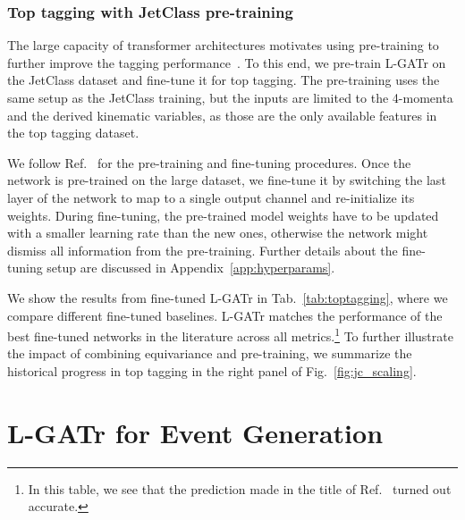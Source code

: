 \documentclass[submission, Phys]{SciPost}
\begin{document}
\subsubsection*{Top tagging with JetClass pre-training}

The large capacity of transformer architectures motivates using pre-training to further improve the tagging performance~\cite{Qu:2022mxj}.
To this end, we pre-train L-GATr on the JetClass dataset and fine-tune it for top tagging.
The pre-training uses the same setup as the JetClass training, but the inputs are limited to the 4-momenta and the derived kinematic variables, as those are the only available features in the top tagging dataset.

We follow Ref.~\cite{Qu:2022mxj} for the pre-training and fine-tuning procedures. Once the network is pre-trained on the large dataset, we fine-tune it by switching the last layer of the network to map to a single output channel and re-initialize its weights. During fine-tuning, the pre-trained model weights have to be updated with a smaller learning rate than the new ones, otherwise the network might dismiss all information from the pre-training. Further details about the fine-tuning setup are discussed in Appendix~\ref{app:hyperparams}.

We show the results from fine-tuned L-GATr in Tab.~\ref{tab:toptagging}, where we compare different fine-tuned baselines. L-GATr matches the performance of the best fine-tuned networks in the literature across all metrics.\footnote{In this table, we see that the prediction made in the title of Ref.~\cite{Kasieczka:2017nvn} turned out accurate.} To further illustrate the impact of combining equivariance and pre-training, we summarize the historical progress in top tagging in the right panel of Fig.~\ref{fig:jc_scaling}.

\section{L-GATr for Event Generation}
\label{sec:generation}
\end{document}
